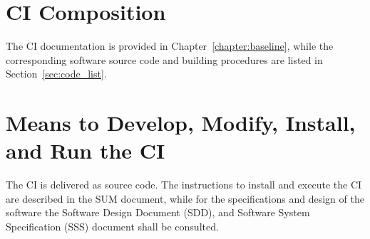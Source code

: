 \section{CI Composition}

The CI documentation is provided in Chapter~\ref{chapter:baseline}, while the corresponding software source code and building procedures are listed in Section~\ref{sec:code_list}.

\section{Means to Develop, Modify, Install, and Run the CI}

The CI is delivered as source code. The instructions to install and execute the CI are described in the SUM document, while for the specifications and design of the software the Software Design Document (SDD), and Software System Specification (SSS) document shall be consulted.

